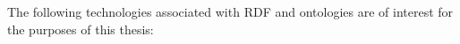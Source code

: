 The following technologies associated with \gls{RDF} and ontologies
are of interest for the purposes of this thesis:
%    
%    
%    

